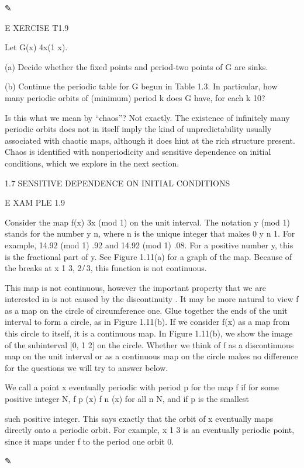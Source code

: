 \documentclass[12pt]{article}
\begin{document}
✎

E XERCISE T1.9

Let G(x)  4x(1  x).

(a) Decide whether the ﬁxed points and period-two points of G are sinks.

(b) Continue the periodic table for G begun in Table 1.3. In particular, how many periodic orbits of 
(minimum) period k does G have, for each k 10?

Is this what we mean by “chaos”? Not exactly. The existence of inﬁnitely many periodic orbits does not in 
itself imply the kind of unpredictability usually associated with chaotic maps, although it does hint at 
the rich structure present. Chaos is identiﬁed with nonperiodicity and sensitive dependence on initial 
conditions, which we explore in the next section.

1.7 SENSITIVE DEPENDENCE ON INITIAL CONDITIONS

E XAM PLE 1.9

Consider the map f(x)  3x (mod 1) on the unit interval. The notation y (mod 1) stands for the number y n, 
where n is the unique integer that makes 0 y n    1. For example, 14.92 (mod 1)  .92 and 14.92 (mod 1)  
.08. For a positive number y, this is the fractional part of y. See Figure 1.11(a) for a graph of the map. 
Because of the breaks at x  1  3, 2 ̸ 3, this function is not continuous.

This map is not continuous, however the important property that we are interested in is not caused by the 
discontinuity . It may be more natural to view f as a map on the circle of circumference one. Glue together 
the ends of the unit interval to form a circle, as in Figure 1.11(b). If we consider f(x) as a map from 
this circle to itself, it is a continuous map. In Figure 1.11(b), we show the image of the subinterval [0, 
1  2] on the circle. Whether we think of f as a discontinuous map on the unit interval or as a continuous 
map on the circle makes no difference for the questions we will try to answer below.

We call a point x eventually periodic with period p for the map f if for some positive integer N, f p (x)  
f n (x) for all n 
 N, and if p is the smallest

such positive integer. This says exactly that the orbit of x eventually maps directly onto a periodic 
orbit. For example, x  1  3 is an eventually periodic point, since it maps under f to the period one orbit 
0.

✎
\end{document}
